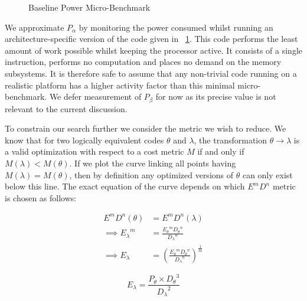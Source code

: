 \begin{figure}[ht]                                                               
\centering                                                                      
\lstset{basicstyle=\ttfamily\footnotesize\bfseries,                             
      frame=tb}                                                                 
                             
\caption{Baseline Power Micro-Benchmark}                            
\label{fig:microbench}                                                           
\end{figure}  

We approximate $P_{\alpha}$ by monitoring the power consumed whilst running an architecture-specific version of the code given in \figurename~\ref{fig:microbench}. This code performs the least amount of work possible whilst keeping the processor active. It consists of a single instruction, performs no computation and places no demand on the memory subsystems. It is therefore safe to assume that any non-trivial code running on a realistic platform has a higher activity factor than this minimal micro-benchmark. We defer measurement of $P_{\beta}$ for now as its precise value is not relevant to the current discussion.


To constrain our search further we consider the metric we wish to reduce. We know that for two logically equivalent codes $\theta$ and $\lambda$, the transformation $\theta \to \lambda$ is a valid optimization with respect to a cost metric $M$ if and only if $M(\lambda) < M(\theta)$. If we plot the curve linking all points having $M(\lambda) = M(\theta)$, then by definition any optimized versions of $\theta$ can only exist below this line. The exact equation of the curve depends on which $E^mD^n$ metric is chosen as follows:



\begin{align}
E^mD^n(\theta) &= E^mD^n(\lambda) \nonumber \\
\implies {E_\lambda}^m &= \frac{{E_\theta}^m{D_\theta}^n}{{D_\lambda}^n} \nonumber \\
\implies E_\lambda &= (\frac{{E_\theta}^m{D_\theta}^n}{{D_\lambda}^n})^\frac{1}{m}
\end{align}

\begin{equation}
 E_{\lambda} = \frac{P_{\theta} \times {D_{\theta}}^{3}}{{D_{\lambda}}^2}
\end{equation}

